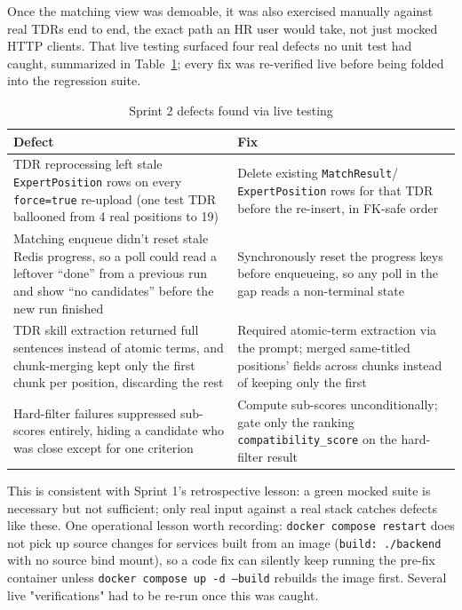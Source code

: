 Once the matching view was demoable, it was also exercised manually
against real TDRs end to end, the exact path an HR user would take, not
just mocked HTTP clients. That live testing surfaced four real defects
no unit test had caught, summarized in
Table~\ref{tab:s2-live-testing-defects}; every fix was re-verified live
before being folded into the regression suite.

\begin{table}[H]
  \centering
  \caption{Sprint 2 defects found via live testing}
  \label{tab:s2-live-testing-defects}
  \begin{tabular}{@{}p{6.8cm}p{10.0cm}@{}}
    \toprule
    Defect & Fix \\
    \midrule
    TDR reprocessing left stale \texttt{ExpertPosition} rows on every
    \texttt{force=true} re-upload (one test TDR ballooned from 4 real
    positions to 19) & Delete existing \texttt{MatchResult}/
    \texttt{ExpertPosition} rows for that TDR before the re-insert, in
    FK-safe order \\
    Matching enqueue didn't reset stale Redis progress, so a poll could
    read a leftover ``done'' from a previous run and show ``no
    candidates'' before the new run finished & Synchronously reset the
    progress keys before enqueueing, so any poll in the gap reads a
    non-terminal state \\
    TDR skill extraction returned full sentences instead of atomic
    terms, and chunk-merging kept only the first chunk per position,
    discarding the rest & Required atomic-term extraction via the
    prompt; merged same-titled positions' fields across chunks instead
    of keeping only the first \\
    Hard-filter failures suppressed sub-scores entirely, hiding a
    candidate who was close except for one criterion & Compute
    sub-scores unconditionally; gate only the ranking
    \texttt{compatibility\_score} on the hard-filter result \\
    \bottomrule
  \end{tabular}
\end{table}

This is consistent with Sprint 1's retrospective lesson: a green mocked
suite is necessary but not sufficient; only real input against a real
stack catches defects like these. One operational lesson worth recording:
\texttt{docker compose restart} does not pick up source changes for
services built from an image (\texttt{build: ./backend} with no source
bind mount), so a code fix can silently keep running the pre-fix
container unless \texttt{docker compose up -d --build} rebuilds the
image first. Several live "verifications" had to be re-run once this
was caught.

